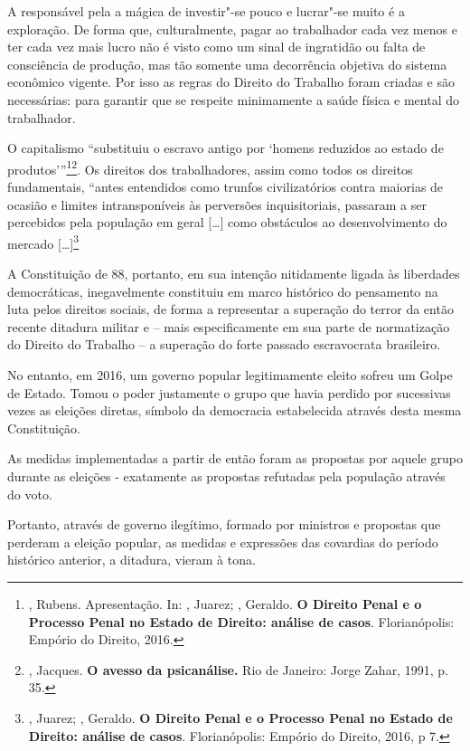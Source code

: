 A responsável pela a mágica de investir"-se pouco e lucrar"-se muito é a
exploração. De forma que, culturalmente, pagar ao trabalhador cada vez
menos e ter cada vez mais lucro não é visto como um sinal de ingratidão
ou falta de consciência de produção, mas tão somente uma decorrência
objetiva do sistema econômico vigente. Por isso as regras do Direito do
Trabalho foram criadas e são necessárias: para garantir que se respeite
minimamente a saúde física e mental do trabalhador.

O capitalismo ``substituiu o escravo antigo por `homens reduzidos ao
estado de produtos'''\footnote{, Rubens. Apresentação. In:
  , Juarez; , Geraldo. \textbf{O Direito Penal e o Processo
  Penal no Estado de Direito: análise de casos}. Florianópolis: Empório
  do Direito, 2016.}\footnote{, Jacques. \textbf{O avesso da
  psicanálise.} Rio de Janeiro: Jorge Zahar, 1991, p. 35.}. Os direitos
dos trabalhadores, assim como todos os direitos fundamentais, ``antes
entendidos como trunfos civilizatórios contra maiorias de ocasião e
limites intransponíveis às perversões inquisitoriais, passaram a ser
percebidos pela população em geral {[}\ldots{}{]} como obstáculos ao
desenvolvimento do mercado {[}\ldots{}{]}\footnote{, Juarez; ,
  Geraldo. \textbf{O Direito Penal e o Processo Penal no Estado de
  Direito: análise de casos}. Florianópolis: Empório do Direito, 2016, p
  7.}

A Constituição de 88, portanto, em sua intenção nitidamente ligada às
liberdades democráticas, inegavelmente constituiu em marco histórico do
pensamento na luta pelos direitos sociais, de forma a representar a
superação do terror da então recente ditadura militar e -- mais
especificamente em sua parte de normatização do Direito do Trabalho -- a
superação do forte passado escravocrata brasileiro.

No entanto, em 2016, um governo popular legitimamente eleito sofreu um
Golpe de Estado. Tomou o poder justamente o grupo que havia perdido por
sucessivas vezes as eleições diretas, símbolo da democracia estabelecida
através desta mesma Constituição.

As medidas implementadas a partir de então foram as propostas por aquele
grupo durante as eleições - exatamente as propostas refutadas pela
população através do voto.

Portanto, através de governo ilegítimo, formado por ministros e
propostas que perderam a eleição popular, as medidas e expressões das
covardias do período histórico anterior, a ditadura, vieram à tona.

